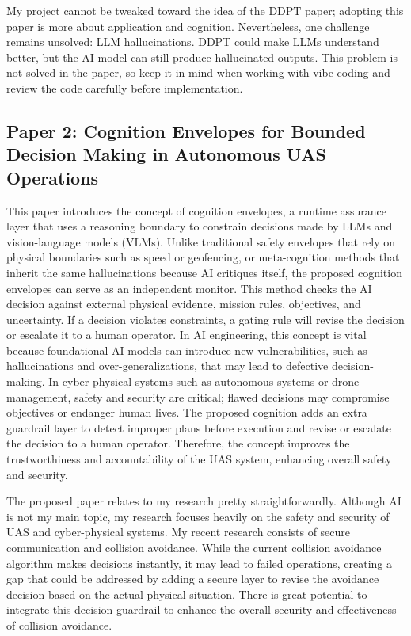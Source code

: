 \documentclass[11pt]{article}
\begin{document}
My project cannot be tweaked toward the idea of the DDPT paper; adopting this paper is more about application and cognition. Nevertheless, one challenge remains unsolved: LLM hallucinations. DDPT could make LLMs understand better, but the AI model can still produce hallucinated outputs. This problem is not solved in the paper, so keep it in mind when working with vibe coding and review the code carefully before implementation. 

\subsection{Paper 2: Cognition Envelopes for Bounded Decision Making
in Autonomous UAS Operations}
This paper introduces the concept of cognition envelopes, a runtime assurance layer that uses a reasoning boundary to constrain decisions made by LLMs and vision-language models (VLMs). Unlike traditional safety envelopes that rely on physical boundaries such as speed or geofencing, or meta-cognition methods that inherit the same hallucinations because AI critiques itself, the proposed cognition envelopes can serve as an independent monitor. This method checks the AI decision against external physical evidence, mission rules, objectives, and uncertainty. If a decision violates constraints, a gating rule will revise the decision or escalate it to a human operator. In AI engineering, this concept is vital because foundational AI models can introduce new vulnerabilities, such as hallucinations and over-generalizations, that may lead to defective decision-making. In cyber-physical systems such as autonomous systems or drone management, safety and security are critical; flawed decisions may compromise objectives or endanger human lives. The proposed cognition adds an extra guardrail layer to detect improper plans before execution and revise or escalate the decision to a human operator. Therefore, the concept improves the trustworthiness and accountability of the UAS system, enhancing overall safety and security.

The proposed paper relates to my research pretty straightforwardly. Although AI is not my main topic, my research focuses heavily on the safety and security of UAS and cyber-physical systems. My recent research consists of secure communication and collision avoidance. While the current collision avoidance algorithm makes decisions instantly, it may lead to failed operations, creating a gap that could be addressed by adding a secure layer to revise the avoidance decision based on the actual physical situation. There is great potential to integrate this decision guardrail to enhance the overall security and effectiveness of collision avoidance.
\end{document}
